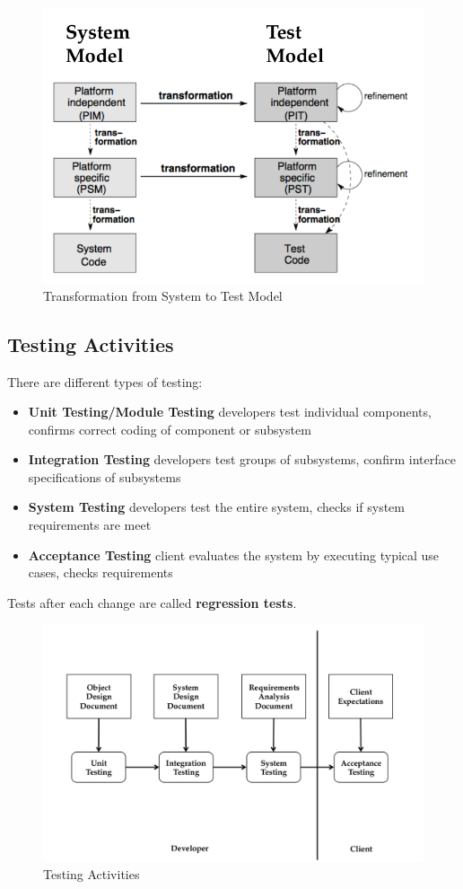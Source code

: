 \begin{figure}[h!]
	\centering
	\includegraphics[width=0.8\linewidth]{images/testing_generating_test_code}
	\caption{Transformation from System to Test Model}
\end{figure}
\newpage

\subsection{Testing Activities}
There are different types of testing:
\begin{itemize}
	\item \textbf{Unit Testing/Module Testing} developers test individual components, confirms correct coding of component or subsystem
	\item \textbf{Integration Testing} developers test groups of subsystems, confirm interface specifications of subsystems
	\item \textbf{System Testing} developers test the entire system, checks if system requirements are meet
	\item \textbf{Acceptance Testing} client evaluates the system by executing typical use cases, checks requirements
\end{itemize}

Tests after each change are called \textbf{regression tests}.

\begin{figure}[h!]
	\centering
	\includegraphics[width=\linewidth]{images/testing_activities}
	\caption{Testing Activities}
\end{figure}
\newpage


